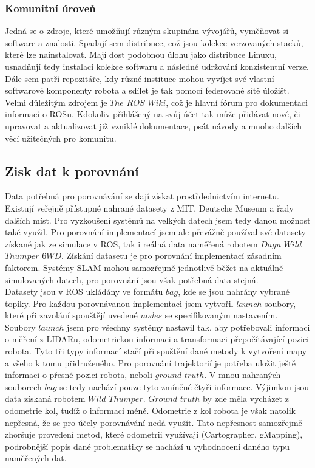 \documentclass[12pt]{article}
\begin{document}
\subsubsection{Komunitní úroveň}
Jedná se o zdroje, které umožňují různým skupinám vývojářů, vyměňovat si software a znalosti. Spadají sem distribuce, což jsou kolekce verzovaných stacků, které lze nainstalovat. Mají dost podobnou úlohu jako distribuce Linuxu, usnadňují tedy instalaci kolekce softwaru a následné udržování konzistentní verze. Dále sem patří repozitáře, kdy různé instituce mohou vyvíjet své vlastní softwarové komponenty robota a sdílet je tak pomocí federované sítě úložišť. Velmi důležitým zdrojem je $The$ $ROS$ $Wiki$, což je hlavní fórum pro dokumentaci informací o ROSu. Kdokoliv přihlášený na svůj účet tak může přidávat nové, či upravovat a aktualizovat již vzniklé dokumentace, psát návody a mnoho dalších věcí užitečných pro komunitu.

\newpage

\subsection{Zisk dat k porovnání}
Data potřebná pro porovnávání se dají získat prostřdednictvím internetu. Existují veřejně přístupné nahrané datasety z MIT, Deutsche Museum a řady dalších míst. Pro vyzkoušení systémů na velkých datech jsem tedy danou možnost také využil. Pro porovnání implementací jsem ale převážně používal své datasety získané jak ze simulace v ROS, tak i reálná data naměřená robotem $Dagu$ $Wild$ $Thumper$ $6WD$. Získání datasetu je pro porovnání implementací zásadním faktorem. Systémy SLAM mohou samozřejmě jednotlivě běžet na aktuálně simulovaných datech, pro porovnání jsou však potřebná data stejná.\\ 
\indent Datasety jsou v ROS ukládány ve formátu $bag$, kde se jsou nahrány vybrané topiky. Pro každou porovnávanou implementaci jsem vytvořil $launch$ soubory, které při zavolání spouštějí uvedené $nodes$ se specifikovaným nastavením. Soubory $launch$ jsem pro všechny systémy nastavil tak, aby potřebovali informaci o měření z LIDARu, odometrickou informaci a transformaci přepočítávající pozici robota. Tyto tři typy informací stačí při spuštění dané metody k vytvoření mapy a všeho k tomu přidruženého. Pro porovnání trajektorií je potřeba uložit ještě informaci o přesné pozici robota, neboli $ground$ $truth$. V mnou nahraných souborech $bag$ se tedy nachází pouze tyto zmíněné čtyři informace. Výjimkou jsou data získaná robotem $Wild$ $Thumper$. $Ground$ $truth$ by zde měla vycházet z odometrie kol, tudíž o informaci méně. Odometrie z kol robota je však natolik nepřesná, že se pro účely porovnávání nedá využít. Tato nepřesnost samozřejmě zhoršuje provedení metod, které odometrii využívají (Cartographer, gMapping), podrobnější popis dané problematiky se nachází u vyhodnocení daného typu naměřených dat.
\end{document}
